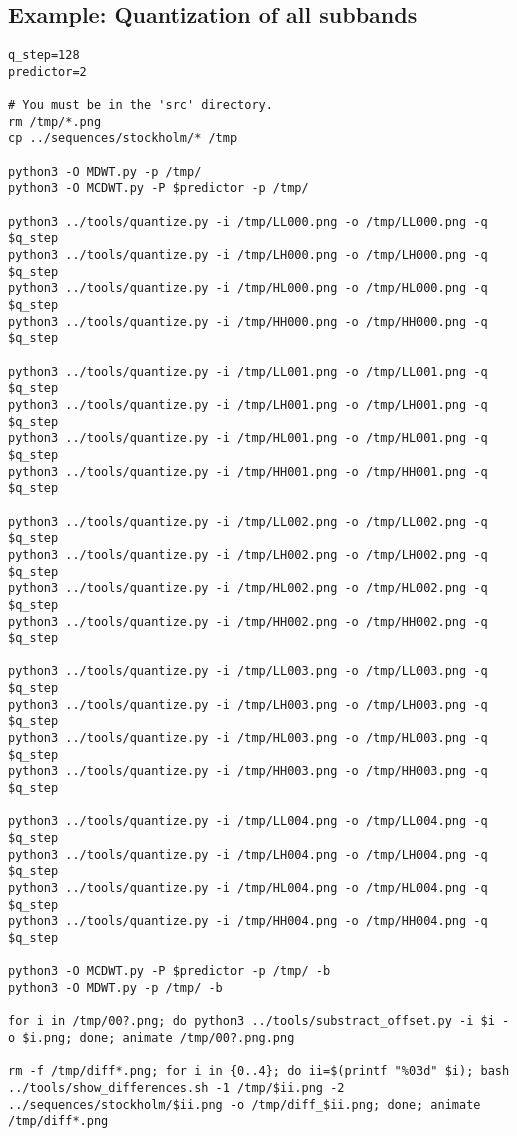 \subsection*{Example: Quantization of all subbands}
\begin{verbatim}
q_step=128
predictor=2

# You must be in the 'src' directory.
rm /tmp/*.png
cp ../sequences/stockholm/* /tmp

python3 -O MDWT.py -p /tmp/
python3 -O MCDWT.py -P $predictor -p /tmp/

python3 ../tools/quantize.py -i /tmp/LL000.png -o /tmp/LL000.png -q $q_step
python3 ../tools/quantize.py -i /tmp/LH000.png -o /tmp/LH000.png -q $q_step
python3 ../tools/quantize.py -i /tmp/HL000.png -o /tmp/HL000.png -q $q_step
python3 ../tools/quantize.py -i /tmp/HH000.png -o /tmp/HH000.png -q $q_step

python3 ../tools/quantize.py -i /tmp/LL001.png -o /tmp/LL001.png -q $q_step
python3 ../tools/quantize.py -i /tmp/LH001.png -o /tmp/LH001.png -q $q_step
python3 ../tools/quantize.py -i /tmp/HL001.png -o /tmp/HL001.png -q $q_step
python3 ../tools/quantize.py -i /tmp/HH001.png -o /tmp/HH001.png -q $q_step

python3 ../tools/quantize.py -i /tmp/LL002.png -o /tmp/LL002.png -q $q_step
python3 ../tools/quantize.py -i /tmp/LH002.png -o /tmp/LH002.png -q $q_step
python3 ../tools/quantize.py -i /tmp/HL002.png -o /tmp/HL002.png -q $q_step
python3 ../tools/quantize.py -i /tmp/HH002.png -o /tmp/HH002.png -q $q_step

python3 ../tools/quantize.py -i /tmp/LL003.png -o /tmp/LL003.png -q $q_step
python3 ../tools/quantize.py -i /tmp/LH003.png -o /tmp/LH003.png -q $q_step
python3 ../tools/quantize.py -i /tmp/HL003.png -o /tmp/HL003.png -q $q_step
python3 ../tools/quantize.py -i /tmp/HH003.png -o /tmp/HH003.png -q $q_step

python3 ../tools/quantize.py -i /tmp/LL004.png -o /tmp/LL004.png -q $q_step
python3 ../tools/quantize.py -i /tmp/LH004.png -o /tmp/LH004.png -q $q_step
python3 ../tools/quantize.py -i /tmp/HL004.png -o /tmp/HL004.png -q $q_step
python3 ../tools/quantize.py -i /tmp/HH004.png -o /tmp/HH004.png -q $q_step

python3 -O MCDWT.py -P $predictor -p /tmp/ -b
python3 -O MDWT.py -p /tmp/ -b 

for i in /tmp/00?.png; do python3 ../tools/substract_offset.py -i $i -o $i.png; done; animate /tmp/00?.png.png

rm -f /tmp/diff*.png; for i in {0..4}; do ii=$(printf "%03d" $i); bash ../tools/show_differences.sh -1 /tmp/$ii.png -2 ../sequences/stockholm/$ii.png -o /tmp/diff_$ii.png; done; animate /tmp/diff*.png
\end{verbatim}

